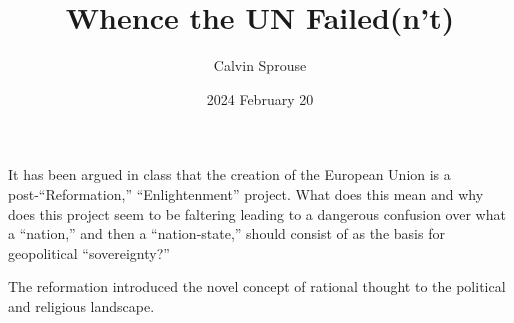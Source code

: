\documentclass[a4paper, 12pt]{article}
\title{Whence the UN Failed(n't)}
\author{Calvin Sprouse}
\affil{Geography 101 World Regional Geography}
\date{2024 February 20}
\begin{document}
\maketitle


\doublespacing\noindent
It has been argued in class that the creation of the European Union is a post-``Reformation,'' ``Enlightenment'' project. What does this mean and why does this project seem to be faltering leading to a dangerous confusion over what a ``nation,'' and then a ``nation-state,'' should consist of as the basis for geopolitical ``sovereignty?''
\vspace*{1\baselineskip}

The reformation introduced the novel concept of rational thought to the political and religious landscape.


\end{document}
